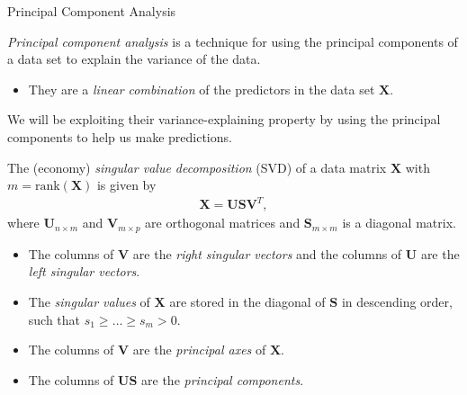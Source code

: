 \documentclass[8pt]{beamer}
\newcommand{\mydef}[1]{\textcolor{SteelBlue3}{\textit{#1}}} %
\begin{document}
\begin{frame}{Principal Component Analysis}

\mydef{Principal component analysis} is a technique for using the principal components of a data set to explain the variance of the data. %
\begin{itemize}
    \item They are a \mydef{linear combination} of the predictors in the data set $\mathbf{X}$. %
\end{itemize}

We will be exploiting their variance-explaining property by using the principal components to help us make predictions. %

The (economy) \mydef{singular value decomposition} (SVD) of a data matrix $\mathbf{X}$ with $m = \mathrm{rank}(\mathbf{X})$ is given by 
\begin{align*}
    \mathbf{X} = \mathbf{U} \mathbf{S} \mathbf{V}^T,
\end{align*} 
where $\mathbf{U}_{n \times m}$ and $\mathbf{V}_{m \times p}$ are orthogonal matrices and $\mathbf{S}_{m \times m}$ is a diagonal matrix. %
\begin{itemize}
    \item The columns of $\mathbf{V}$ are the \mydef{right singular vectors} and the columns of $\mathbf{U}$ are the \mydef{left singular vectors}. %
    \item The \mydef{singular values} of $\mathbf{X}$ are stored in the diagonal of $\mathbf{S}$ in descending order, such that $s_1 \ge \ldots \ge s_m > 0$. %
    \item The columns of $\mathbf{V}$ are the \mydef{principal axes} of $\mathbf{X}$. %
    \item The columns of $\mathbf{US}$ are the \mydef{principal components}.
\end{itemize}
    
\end{frame}
\end{document}
